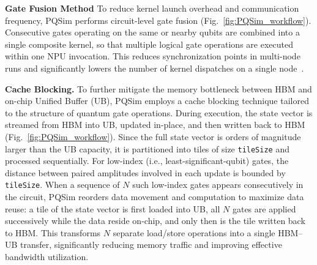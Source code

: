 \documentclass{article}
\begin{document}
\textbf{Gate Fusion Method} To reduce kernel launch overhead and communication frequency, PQSim performs circuit-level gate fusion (Fig.~\ref{fig:PQSim_workflow}). Consecutive gates operating on the same or nearby qubits are combined into a single composite kernel, so that multiple logical gate operations are executed within one NPU invocation. This reduces synchronization points in multi-node runs and significantly lowers the number of kernel dispatches on a single node~\cite{10.1145/3126908.3126947}.

\textbf{Cache Blocking.} To further mitigate the memory bottleneck between HBM and on-chip Unified Buffer (UB), PQSim employs a cache blocking technique tailored to the structure of quantum gate operations. 
During execution, the state vector is streamed from HBM into UB, updated in-place, and then written back to HBM (Fig.~\ref{fig:PQSim_workflow}). 
Since the full state vector is orders of magnitude larger than the UB capacity, it is partitioned into tiles of size \texttt{tileSize} and processed sequentially. For low-index (i.e., least-significant-qubit) gates, the distance between paired amplitudes involved in each update is bounded by \texttt{tileSize}. 
When a sequence of $N$ such low-index gates appears consecutively in the circuit, PQSim reorders data movement and computation to maximize data reuse: 
a tile of the state vector is first loaded into UB, all $N$ gates are applied successively while the data reside on-chip, and only then is the tile written back to HBM. 
This transforms $N$ separate load/store operations into a single HBM--UB transfer, significantly reducing memory traffic and improving effective bandwidth utilization.
\end{document}
